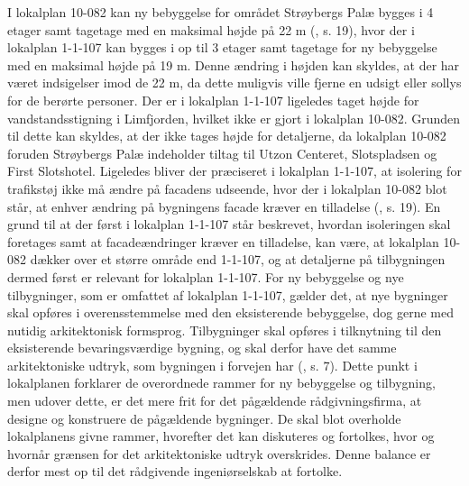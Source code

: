 I lokalplan 10-082 kan ny bebyggelse for området Strøybergs Palæ bygges i 4 etager samt tagetage med en maksimal højde på 22 m (\citep{gammellokalplan}, s. 19), hvor der i lokalplan 1-1-107 kan bygges i op til 3 etager samt tagetage for ny bebyggelse med en maksimal højde på 19 m. Denne ændring i højden kan skyldes, at der har været indsigelser imod de 22 m, da dette muligvis ville fjerne en udsigt eller sollys for de berørte personer. 
\newline \indent{     }  Der er i lokalplan 1-1-107 ligeledes taget højde for vandstandsstigning i Limfjorden, hvilket ikke er gjort i lokalplan 10-082. Grunden til dette kan skyldes, at der ikke tages højde for detaljerne, da lokalplan 10-082 foruden Strøybergs Palæ indeholder tiltag til Utzon Centeret, Slotspladsen og First Slotshotel.
\newline \indent{     }  Ligeledes bliver der præciseret i lokalplan 1-1-107, at isolering for trafikstøj ikke må ændre på facadens udseende, hvor der i lokalplan 10-082 blot står, at enhver ændring på bygningens facade kræver en tilladelse (\citep{gammellokalplan}, s. 19). En grund til at der først i lokalplan 1-1-107 står beskrevet, hvordan isoleringen skal foretages samt at facadeændringer kræver en tilladelse, kan være, at lokalplan 10-082 dækker over et større område end 1-1-107, og at detaljerne på tilbygningen dermed først er relevant for lokalplan 1-1-107. 
\newline \indent{     }  For ny bebyggelse og nye tilbygninger, som er omfattet af lokalplan 1-1-107, gælder det, at nye bygninger skal opføres i overensstemmelse med den eksisterende bebyggelse, dog gerne med nutidig arkitektonisk formsprog. Tilbygninger skal opføres i tilknytning til den eksisterende bevaringsværdige bygning, og skal derfor have det samme arkitektoniske udtryk, som bygningen i forvejen har (\citep{lokalplan}, s. 7). 
\newline \indent{     }  Dette punkt i lokalplanen forklarer de overordnede rammer for ny bebyggelse og tilbygning, men udover dette, er det mere frit for det pågældende rådgivningsfirma, at designe og konstruere de pågældende bygninger. De skal blot overholde lokalplanens givne rammer, hvorefter det kan diskuteres og fortolkes, hvor og hvornår grænsen for det arkitektoniske udtryk overskrides. Denne balance er derfor mest op til det rådgivende ingeniørselskab at fortolke.


